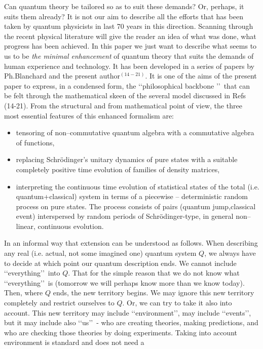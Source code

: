 \documentclass[12pt]{article}
\def\lqq{\lq\lq}
\def\rqq{\rq\rq}
\begin{document}
Can quantum theory be tailored so as to suit these demands? Or, perhaps,
it suits them already? It is not our aim to describe all the efforts
that has been taken by quantum physicists in last 70 years in this
direction. Scanning through the recent physical literature will give the
reader an idea of what was done, what progress has been achieved. In
this paper we just want to describe what seems to us to be {\sl the
minimal enhancement} of quantum theory that suits the demands of human
experience and technology. It has been developed in a series of papers
by Ph.Blanchard and the present author$^{(14-21)}$. It is one of the aims of
the present paper to express, in a condensed form, the \lqq philosophical
backbone \rqq\, that can be felt through the mathematical skeen of
the several model discussed in Refs (14-21).
{}From the structural
and from mathematical point of view, the three most essential features
of this enhanced formalism are:
\begin{itemize}
\item tensoring of non--commutative quantum algebra with a commutative
algebra of functions,
\item replacing Schr\"odinger's unitary dynamics of pure states with a
suitable completely positive time evolution of families of density
matrices,
\item interpreting the continuous time evolution of statistical states
of the total (i.e. quantum+classical) system in terms of a piecewise --
deterministic random process on pure states. The process consists of
pairs (quantum jump,classical event) interspersed by random periods of
Schr\"odinger-type, in general non--linear, continuous evolution.
\end{itemize}
In an informal way that extension can be understood as follows. When
describing any real (i.e. actual, not some imagined one) quantum system
$Q$, we always have to decide at which point our quantum description
ends. We cannot include \lqq everything\rqq\,  into $Q$. That for the simple
reason that we do not know what \lqq everything\rqq\,  is (tomorrow we will
perhaps know more than we know today). Then, where $Q$ ends, the new
territory begins. We may ignore this new territory completely and
restrict ourselves to $Q$. Or, we can try to take it also into account.
This new territory may include \lqq environment\rqq, may include
\lqq events\rqq, but
it may include also \lqq us\rqq\,  - who are creating theories, making
predictions, and who are checking those theories by doing experiments.
Taking into account environment is standard and does not need a
\end{document}
